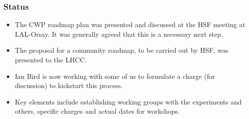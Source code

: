 \begin{frame}
\frametitle{Status}

\begin{itemize}
\item The CWP roadmap plan was presented and discussed at the HSF meeting at LAL-Orsay. It was generally agreed that this is a necessary next step.
\item The proposal for a community roadmap, to be carried out by HSF, was presented to the LHCC.
\item Ian Bird is now working with some of us to formulate a charge (for discussion) to kickstart this process.
\item Key elements include establishing working groups with the experiments and others, specific charges and actual dates for workshops.
\end{itemize}

\end{frame}


